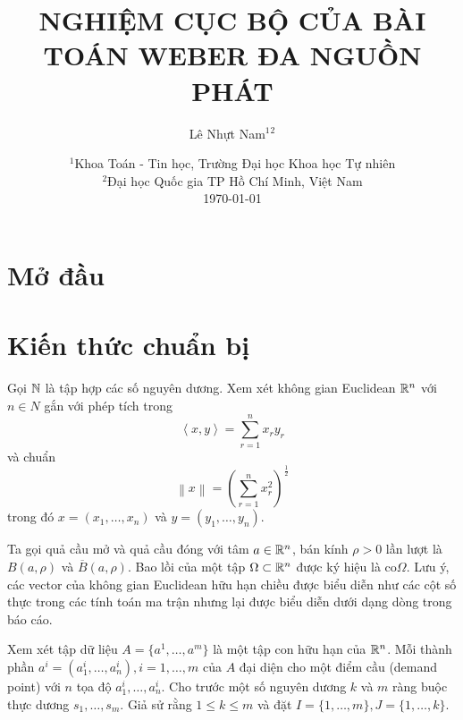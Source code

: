 \documentclass[a4paper]{report}
\title{NGHIỆM CỤC BỘ CỦA BÀI TOÁN WEBER ĐA NGUỒN PHÁT}
\author{Lê Nhựt Nam$^1$$^2$}
\date{
    $^1$Khoa Toán - Tin học, Trường Đại học Khoa học Tự nhiên\\%
    $^2$Đại học Quốc gia TP Hồ Chí Minh, Việt Nam\\%
    \vfill
    \today
}
\begin{document}
    \maketitle
    \tableofcontents
    
    
    \chapter{Mở đầu}


    \chapter{Kiến thức chuẩn bị}

    Gọi $\mathbb{N}$ là tập hợp các số nguyên dương. Xem xét không gian Euclidean $\mathbb{R}^n$ với $n \in N$ gắn với phép tích trong 
    \begin{equation}
        \left< x, y\right> = \sum_{r = 1}^n x_ry_r
    \end{equation}
    và chuẩn 
    \begin{equation}
        \left\| x\right\| = \left(\sum_{r = 1}^nx^2_r\right)^{\frac{1}{2}} 
    \end{equation}
    trong đó $x = (x_1, \dots, x_n)$ và $y = (y_1, \dots, y_n)$.

    Ta gọi quả cầu mở và quả cầu đóng với tâm $a \in \mathbb{R}^n$, bán kính $\rho > 0$ lần lượt là $B(a, \rho)$ và $\overline{B}(a, \rho)$. Bao lồi của một tập $\Omega \subset \mathbb{R}^n$ được ký hiệu là $\text{co}\Omega$. Lưu ý, các vector của không gian Euclidean hữu hạn chiều được biểu diễn như các cột số thực trong các tính toán ma trận nhưng lại được biểu diễn dưới dạng dòng trong báo cáo.

    Xem xét tập dữ liệu $A = \{a^1, \dots, a^m\}$ là một tập con hữu hạn của $\mathbb{R}^n$. Mỗi thành phần $a^i = (a^i_1, \dots, a^i_n), i = 1, \dots, m$ của $A$ đại diện cho một điểm cầu (demand point) với $n$ tọa độ $a^i_1, \dots, a^i_n$. Cho trước một số nguyên dương $k$ và $m$ ràng buộc thực dương $s_1, \dots, s_m$. Giả sử rằng $1 \leq k \leq m$ và đặt $I = \{1, \dots, m\}, J = \{1, \dots, k\}$.
\end{document}
